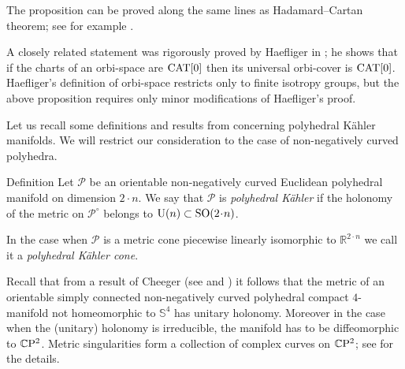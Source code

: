 \documentclass[oneside,a4paper]{article}
\def\SS{\mathbb{S}}
\begin{document}
The proposition can be proved along the same lines as Hadamard--Cartan theorem;
see for example \cite{akp}.

A closely related statement was rigorously proved by Haefliger in \cite{haefliger};
he shows that if the charts of an orbi-space are $\mathrm{CAT}[0]$
then its universal orbi-cover is $\mathrm{CAT}[0]$.
Haefliger's definition of orbi-space restricts only to finite isotropy groups, but the above proposition requires only minor modifications of  Haefliger's  proof.


Let us recall  some definitions and results
from \cite{panov} concerning polyhedral K\"ahler manifolds.
We will restrict our consideration to the case of non-negatively curved polyhedra.

\begin{thm}{Definition}\label{PKdefinition} Let $\mathcal{P}$ be an orientable non-negatively curved Euclidean
polyhedral manifold on dimension $2{\cdot}n$.
We say that  $\mathcal{P}$ is
\emph{polyhedral K\"ahler} if the holonomy of the metric
on $\mathcal{P}^\circ$ belongs to
$\mathrm{U}(n)\subset \SO(2\cdot n)$.

In the case  when $\mathcal{P}$ is a metric cone
piecewise linearly isomorphic to $\mathbb R^{2\cdot n}$ we call it a \emph{polyhedral K\"ahler cone}.
\end{thm}

Recall that from a result of Cheeger (see \cite{cheeger} and \cite[Proposition 2.3]{panov})
it follows that the metric of an orientable simply connected non-negatively curved polyhedral
compact $4$-manifold not homeomorphic to $\SS^4$ has unitary holonomy.
Moreover in the case when the (unitary) holonomy is irreducible,
the manifold has to be diffeomorphic to $\mathbb{C}\mathrm{P}^2$. Metric singularities
form a collection of complex curves on $\mathbb{C}\mathrm{P}^2$;
see \cite{panov} for the details.
\end{document}
